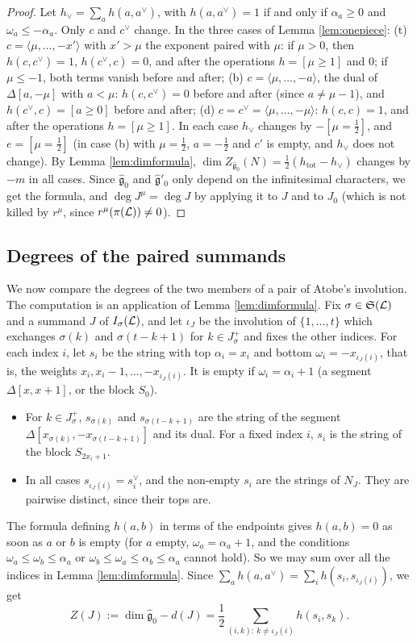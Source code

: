 \documentclass[a4paper,12pt,leqno]{amsart}
\theoremstyle{plain}
\theoremstyle{definition}
\providecommand{\frS}{\mathfrak{S}}\providecommand{\frs}{\mathfrak{s}}
\begin{document}
\begin{proof}
Let $h_\vee=\sum_ah(a,a^\vee)$, with $h(a,a^\vee)=1$ if and only if $\alpha_a\geq0$ and $\omega_a\leq -\alpha_a$. Only $c$
and $c^\vee$ change. In the three cases of Lemma \ref{lem:onepiece}:
(t) $c=\langle\mu,\ldots,-x'\rangle$ with $x'>\mu$ the exponent paired with $\mu$: if $\mu>0$, then
$h(c,c^\vee)=1$, $h(c^\vee,c)=0$, and after the operations $h=[\mu\geq1]$ and $0$; if $\mu\leq-1$, both
terms vanish before and after;
(b) $c=\langle\mu,\ldots,-a\rangle$, the dual of $\Delta[a,-\mu]$ with $a<\mu$: $h(c,c^\vee)=0$ before and after (since
$a\neq\mu-1$), and $h(c^\vee,c)=[a\geq0]$ before and after;
(d) $c=c^\vee=\langle\mu,\ldots,-\mu\rangle$: $h(c,c)=1$, and after the operations $h=[\mu\geq1]$.
In each case $h_\vee$ changes by $-[\mu=\tfrac12]$, and $e=[\mu=\tfrac12]$ (in case (b) with $\mu=\tfrac12$,
$a=-\tfrac12$ and $c'$ is empty, and $h_\vee$ does not change). By Lemma \ref{lem:dimformula},
$\dim Z_{\widehat{\mathfrak g}_0}(N)=\frac12(h_{\mathrm{tot}}-h_\vee)$ changes by $-m$ in all cases. Since
$\widehat{\mathfrak g}_0$ and $\widehat{\mathfrak g}'_0$ only depend on the infinitesimal characters, we
get the formula, and $\deg J^\mu=\deg J$ by applying it to $J$ and to $J_0$ (which is not killed by $r^\mu$, since
$r^\mu(\pi(\mathcal{L}))\neq0$).
\end{proof}

\subsection{Degrees of the paired summands}
We now compare the degrees of the two members of a pair of Atobe's involution. The computation is
an application of Lemma \ref{lem:dimformula}. Fix $\sigma\in\frS(\caL)$ and a summand $J$ of
$I_\sigma(\mathcal{L})$, and let $\iota_J$ be the involution of $\{1,\ldots,t\}$ which exchanges $\sigma(k)$ and
$\sigma(t-k+1)$ for $k\in J^+_\sigma$ and fixes the other indices. For each index $i$, let $s_i$ be the
string with top $\alpha_i=x_i$ and bottom $\omega_i=-x_{\iota_J(i)}$, that is, the weights $x_i,x_i-1,\ldots,
-x_{\iota_J(i)}$. It is empty if $\omega_i=\alpha_i+1$ (a segment $\Delta[x,x+1]$, or the block $S_0$).
\begin{itemize}
\item For $k\in J^+_\sigma$, $s_{\sigma(k)}$ and $s_{\sigma(t-k+1)}$ are the string of the segment
$\Delta[x_{\sigma(k)},-x_{\sigma(t-k+1)}]$ and its dual. For a fixed index $i$, $s_i$ is the string of the
block $S_{2x_i+1}$.
\item In all cases $s_{\iota_J(i)}=s_i^\vee$, and the non-empty $s_i$ are the strings of $N_J$. They are
pairwise distinct, since their tops are.
\end{itemize}
The formula defining $h(a,b)$ in terms of the endpoints gives $h(a,b)=0$ as soon as $a$ or $b$ is
empty (for $a$ empty, $\omega_a=\alpha_a+1$, and the conditions $\omega_a\leq \omega_b\leq \alpha_a$ or $\omega_b\leq \omega_a\leq
\alpha_b\leq \alpha_a$ cannot hold). So we may sum over all the indices in Lemma \ref{lem:dimformula}. Since
$\sum_ah(a,a^\vee)=\sum_ih(s_i,s_{\iota_J(i)})$, we get
\begin{equation}\label{eq:Zpi}
Z(J):=\dim\widehat{\mathfrak g}_0-d(J)=\frac12\sum_{(i,k):\ k\neq\iota_J(i)}h(s_i,s_k).
\end{equation}
\end{document}
